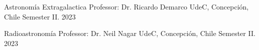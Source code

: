 
\begin{cventries}

  \cventry
    {Astronomía Extragalactica}
    {Professor: Dr. Ricardo Demarco}
    {UdeC, Concepción, Chile}
    {Semester II. 2023}
    {}

  \cventry
    {Radioastronomía}
    {Professor: Dr. Neil Nagar}
    {UdeC, Concepción, Chile}
    {Semester II. 2023}
    {}
    
\end{cventries}
